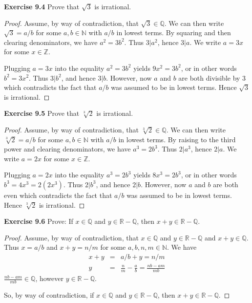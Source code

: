 \documentclass[12pt,oneside]{article}
\newenvironment{exercise}[1]{\vspace{.1in}\noindent\textbf{Exercise #1 \hspace{.05em}}}{}
\newcommand{\R}{\mathbb{R}}
\newcommand{\Z}{\mathbb{Z}}
\newcommand{\Q}{\mathbb{Q}}
\newcommand{\N}{\mathbb{N}}
\begin{document}

\begin{exercise}{9.4}
Prove that $\sqrt{3}$ is irrational.
\end{exercise}

\begin{proof}
Assume, by way of contradiction, that $\sqrt{3} \in \Q$. We can then write $\sqrt{3} = a/b$ for some $a,b \in \N$ with $a/b$ in lowest terms. By squaring and then clearing denominators, we have $a^2 = 3b^2$. Thus $3|a^2$, hence $3|a$. We write $a = 3x$ for some $x \in \Z$.

Plugging $a = 3x$ into the equality $a^2 = 3b^2$ yields $9x^2 = 3b^2$, or in other words $b^2 = 3x^2$. Thus $3|b^2$, and hence $3|b$. However, now $a$ and $b$ are both divisible by $3$ which contradicts the fact that $a/b$ was assumed to be in lowest terms. Hence $\sqrt{3}$ is irrational.
\end{proof}



\begin{exercise}{9.5}
Prove that $\sqrt[3]{2}$ is irrational.
\end{exercise}

\begin{proof}
Assume, by way of contradiction, that $\sqrt[3]{2} \in \Q$. We can then write $\sqrt[3]{2} = a/b$ for some $a,b \in \N$ with $a/b$ in lowest terms. By raising to the third power and clearing denominators, we have $a^3 = 2b^3$. Thus $2|a^3$, hence $2|a$. We write $a = 2x$ for some $x \in \Z$.

Plugging $a = 2x$ into the equality $a^3 = 2b^3$ yields $8x^3 = 2b^3$, or in other words $b^3 = 4x^3 = 2(2x^3)$. Thus $2|b^3$, and hence $2|b$. However, now $a$ and $b$ are both even which contradicts the fact that $a/b$ was assumed to be in lowest terms. Hence $\sqrt[3]{2}$ is irrational. 
\end{proof}



\begin{exercise}{9.6}
Prove: If $x \in \Q$ and $y \in \R - \Q$, then $x+y \in \R - \Q$.
\end{exercise}

\begin{proof}
Assume, by way of contradiction, that $x \in \Q$ and $y \in \R - \Q$ and $x+y \in \Q$. Thus $x = a/b$ and $x + y = n/m$ for some $a,b,n,m \in \N$. We have
\begin{eqnarray*}
x + y &=& a/b + y = n/m \\
y &=& \frac{n}{m} - \frac{a}{b} = \frac{nb - am}{mb}
\end{eqnarray*}
$\frac{nb - am}{mb} \in \Q$, however $y \in \R - \Q$.

So, by way of contradiction, if $x \in \Q$ and $y \in \R - \Q$, then $x+y \in \R - \Q$.
\end{proof}
\end{document}
